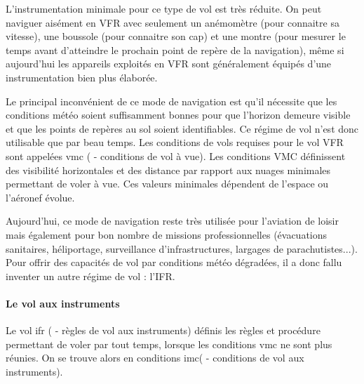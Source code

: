 		L'instrumentation minimale pour ce type de vol est très réduite. On peut naviguer aisément en VFR avec seulement un anémomètre (pour connaitre sa vitesse), une boussole (pour connaitre son cap) et une montre (pour mesurer le temps avant d'atteindre le prochain point de repère de la navigation), même si aujourd'hui les appareils exploités en VFR sont généralement équipés d'une instrumentation bien plus élaborée.
		
		
		Le principal inconvénient de ce mode de navigation est qu'il nécessite que les conditions météo soient suffisamment bonnes pour que l'horizon demeure visible et que les points de repères au sol soient identifiables. Ce régime de vol n'est donc utilisable que par beau temps. Les conditions de vols requises pour le vol VFR sont appelées \acrshort{vmc} ( - conditions de vol à vue). Les conditions VMC définissent des visibilité horizontales et des distance par rapport aux nuages minimales permettant de voler à vue. Ces valeurs minimales dépendent de l'espace ou l'aéronef évolue.
		
		
		
		Aujourd'hui, ce mode de navigation reste très utilisée pour l'aviation de loisir mais également pour bon nombre de missions professionnelles (évacuations sanitaires, héliportage, surveillance d'infrastructures, largages de parachutistes...). \\
		
		Pour offrir des capacités de vol par conditions météo dégradées, il a donc fallu inventer un autre régime de vol : l'IFR.
		
		\paragraph{Le vol aux instruments}
		Le vol \acrshort{ifr} ( - règles de vol aux instruments) définis les règles et procédure permettant de voler par tout temps, lorsque les conditions \acrshort{vmc} ne sont plus réunies. On se trouve alors en conditions \acrshort{imc}( - conditions de vol aux instruments).
		
